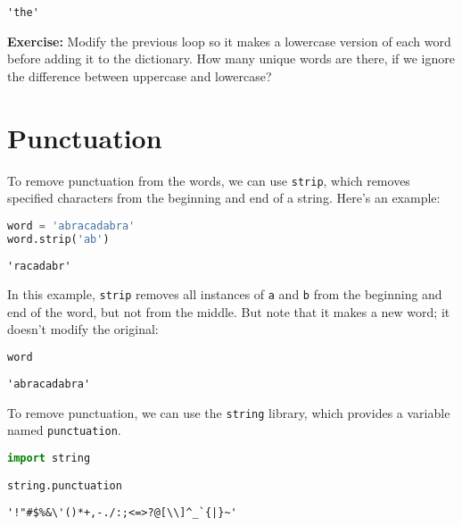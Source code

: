 \begin{lstlisting}[]
'the'
\end{lstlisting}

\textbf{Exercise:} Modify the previous loop so it makes a lowercase
version of each word before adding it to the dictionary. How many unique
words are there, if we ignore the difference between uppercase and
lowercase?

\hypertarget{punctuation}{%
\section{Punctuation}\label{punctuation}}

To remove punctuation from the words, we can use
\passthrough{\lstinline!strip!}, which removes specified characters from
the beginning and end of a string. Here's an example:

\begin{lstlisting}[language=Python]
word = 'abracadabra'
word.strip('ab')
\end{lstlisting}

\begin{lstlisting}[]
'racadabr'
\end{lstlisting}

In this example, \passthrough{\lstinline!strip!} removes all instances
of \passthrough{\lstinline!a!} and \passthrough{\lstinline!b!} from the
beginning and end of the word, but not from the middle. But note that it
makes a new word; it doesn't modify the original:

\begin{lstlisting}[language=Python]
word
\end{lstlisting}

\begin{lstlisting}[]
'abracadabra'
\end{lstlisting}

To remove punctuation, we can use the \passthrough{\lstinline!string!}
library, which provides a variable named
\passthrough{\lstinline!punctuation!}.

\begin{lstlisting}[language=Python]
import string

string.punctuation
\end{lstlisting}

\begin{lstlisting}[]
'!"#$%&\'()*+,-./:;<=>?@[\\]^_`{|}~'
\end{lstlisting}

